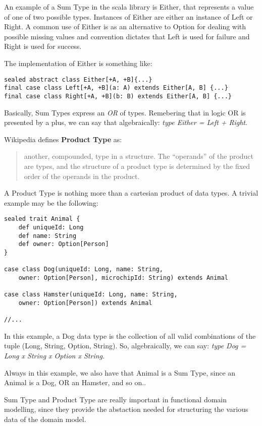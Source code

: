 An example of a Sum Type in the scala library is Either, that represents
a value of one of two possible types. Instances of Either are either an
instance of Left or Right. A common use of Either is as an alternative
to Option for dealing with possible missing values and convention
dictates that Left is used for failure and Right is used for success.

The implementation of Either is something like:

\begin{verbatim}
sealed abstract class Either[+A, +B]{...}
final case class Left[+A, +B](a: A) extends Either[A, B] {...}
final case class Right[+A, +B](b: B) extends Either[A, B] {...}
\end{verbatim}

Basically, Sum Types express an \emph{OR} of types. Remebering that in
logic OR is presented by a plus, we can say that algebraically:
\emph{type Either = Left + Right}.

Wikipedia defines \textbf{Product Type} as:

\begin{quote}
another, compounded, type in a structure. The ``operands'' of the
product are types, and the structure of a product type is determined by
the fixed order of the operands in the product.
\end{quote}

A Product Type is nothing more than a cartesian product of data types. A
trivial example may be the following:

\begin{verbatim}
sealed trait Animal {
    def uniqueId: Long
    def name: String
    def owner: Option[Person]
}

case class Dog(uniqueId: Long, name: String,
    owner: Option[Person], microchipId: String) extends Animal

case class Hamster(uniqueId: Long, name: String,
    owner: Option[Person]) extends Animal

//...
\end{verbatim}

In this example, a Dog data type is the collection of all valid
combinations of the tuple (Long, String, Option, String). So,
algebraically, we can say: \emph{type Dog = Long x String x Option x
String}.

Always in this example, we also have that Animal is a Sum Type, since an
Animal is a Dog, OR an Hamster, and so on..

Sum Type and Product Type are really important in functional domain
modelling, since they provide the abstaction needed for structuring the
various data of the domain model.

